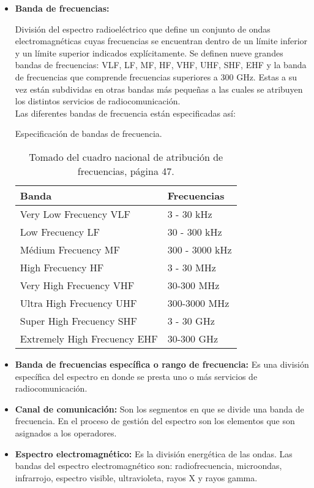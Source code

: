 \begin{itemize}
\item \textbf{Banda de frecuencias:} \cite{Cuadro}  {División del espectro radioeléctrico que define un conjunto de ondas electromagnéticas cuyas frecuencias se encuentran dentro de un límite inferior y un límite superior indicados explícitamente.
Se definen nueve grandes bandas de frecuencias: VLF, LF, MF, HF, VHF, UHF, SHF, EHF y la banda de frecuencias que comprende frecuencias superiores a 300 GHz. Estas a su vez están subdividas en otras bandas más pequeñas a las cuales se atribuyen los distintos servicios de
radiocomunicación.
\\
Las diferentes bandas de frecuencia están especificadas así:
\begin{table}[H]
	\centering
	\label{tabla:bandas}
	\caption{Especificación de bandas de frecuencia.}
	\caption*{Tomado del cuadro nacional de atribución de frecuencias, página 47.}
	\begin{tabular}{|p{5.5cm}|p{5.5cm}|}
		\hline
			\cellcolor[gray]{0.9} \textbf{Banda} & \cellcolor[gray]{0.9}\textbf{Frecuencias} \\
		\hline
		Very Low Frecuency VLF & 3 - 30 kHz \\
		\hline
		Low Frecuency LF & 30 - 300 kHz\\
		\hline
		Médium Frecuency MF & 300 - 3000 kHz\\
		\hline
		High Frecuency HF & 3 - 30 MHz\\
		\hline
		Very High Frecuency	VHF & 30-300 MHz\\
		\hline
 		Ultra High Frecuency UHF & 300-3000 MHz\\
 		\hline
		Super High Frecuency SHF & 3 - 30 GHz\\
		\hline
		Extremely High Frecuency EHF & 30-300 GHz\\
		\hline
	\end{tabular}
\end{table}

}

\item \textbf{Banda de frecuencias específica o rango de frecuencia:} \cite{Cuadro} Es una división específica del espectro en donde se presta uno o más servicios de radiocomunicación.

\item \textbf{Canal de comunicación:} \cite{Cuadro} Son los segmentos en que se divide una banda de frecuencia. En el proceso de gestión del espectro son los elementos que son asignados a los operadores.

\item \textbf{Espectro electromagnético:} \cite{Cuadro} Es la división energética de las ondas. Las bandas del espectro electromagnético son: radiofrecuencia, microondas, infrarrojo, espectro visible, ultravioleta, rayos X y rayos gamma.


\end{itemize}
